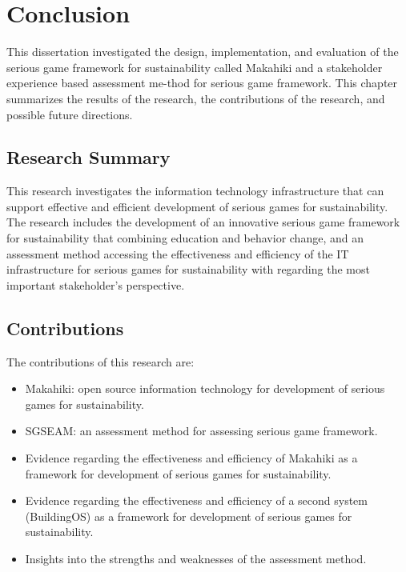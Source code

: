 \chapter{Conclusion}
\label{cha:conclusion}

This dissertation investigated the design, implementation, and evaluation of the serious game framework for sustainability called Makahiki and a stakeholder experience based assessment me-thod for serious game framework. This chapter summarizes the results of the research, the contributions of the research, and possible future directions.

\section{Research Summary}
This research investigates the information technology infrastructure that can support effective and efficient development of serious games for sustainability. The research includes the development of an innovative serious game framework for sustainability that combining education and behavior change, and an assessment method accessing the effectiveness and efficiency of the IT infrastructure for serious games for sustainability with regarding the most important stakeholder's perspective.




\section{Contributions}

The contributions of this research are:


\begin{itemize}
	\item Makahiki: open source information technology for development of serious games for sustainability.
	\item SGSEAM: an assessment method for assessing serious game framework.
	\item Evidence regarding the effectiveness and efficiency of Makahiki as a framework for development of serious games for sustainability.
	\item Evidence regarding the effectiveness and efficiency of a second system (BuildingOS) as a framework for development of serious games for sustainability.
	\item Insights into the strengths and weaknesses of the assessment method.
\end{itemize}

